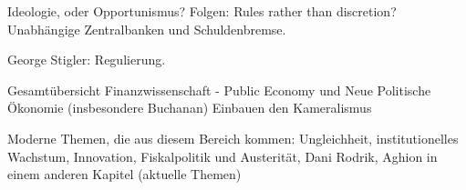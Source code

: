 Ideologie, oder Opportunismus? Folgen: Rules rather than discretion? Unabhängige Zentralbanken und Schuldenbremse.

George Stigler: Regulierung.


Gesamtübersicht Finanzwissenschaft - Public Economy und Neue Politische Ökonomie (insbesondere Buchanan)
Einbauen den Kameralismus \parencite{Backhaus2005}

Moderne Themen, die aus diesem Bereich kommen: Ungleichheit, institutionelles Wachstum, Innovation, Fiskalpolitik und Austerität, Dani Rodrik, Aghion in einem anderen Kapitel (aktuelle Themen)









